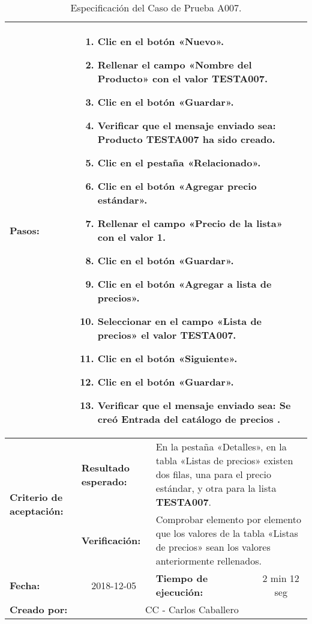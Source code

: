 \begin{table}
\begin{tabular}{|p{2.5cm}|p{2.8cm}|p{2.2cm}|p{2.8cm}|p{2.2cm}|}
\hline
\footnotesize{\textbf{Pasos:}} &
\multicolumn{4}{p{11.8cm}|}{\footnotesize{
\vspace{-3mm}
\begin{enumerate}
\item Clic en el botón «Nuevo».
\item Rellenar el campo «Nombre del Producto» con el valor \textbf{TESTA007}.
\item Clic en el botón «Guardar».
\item Verificar que el mensaje enviado sea:
    \textbf{Producto TESTA007 ha sido creado}.
\item Clic en el pestaña «Relacionado».
\item Clic en el botón «Agregar precio estándar».
\item Rellenar el campo «Precio de la lista» con el valor \textbf{1}.
\item Clic en el botón «Guardar».
\item Clic en el botón «Agregar a lista de precios».
\item Seleccionar en el campo «Lista de precios» el valor \textbf{TESTA007}.
\item Clic en el botón «Siguiente».
\item Clic en el botón «Guardar».
\item Verificar que el mensaje enviado sea:
    \textbf{Se creó Entrada del catálogo de precios .}
\end{enumerate}
\vspace{-5mm}
}} \\
\hline
\multirow{2}{2.8cm}{\footnotesize{\textbf{Criterio de aceptación:}}} &
\footnotesize{\textbf{Resultado esperado:}} &
\multicolumn{3}{p{9.1cm}|}{\footnotesize{En la pestaña «Detalles», en la tabla
«Listas de precios» existen dos filas, una para el precio estándar, y otra para
la lista \textbf{TESTA007}.}} \\
\cline{2-5}
& \footnotesize{\textbf{Verificación:}} &
\multicolumn{3}{p{9.1cm}|}{\footnotesize{Comprobar elemento por elemento que los
valores de la tabla «Listas de precios» sean los valores anteriormente
rellenados.}} \\
\hline
\footnotesize{\textbf{Fecha:}} &
\multicolumn{1}{c|}{\footnotesize{2018-12-05}} &
\multicolumn{2}{l|}{\footnotesize{\textbf{Tiempo de ejecución:}}} &
\multicolumn{1}{c|}{\footnotesize{2 min 12 seg}} \\
\hline
\footnotesize{\textbf{Creado por:}} &
\multicolumn{4}{c|}{\footnotesize{CC - Carlos Caballero}} \\
\hline
\end{tabular}
\caption{Especificación del Caso de Prueba A007.}
\label{tca007}
\end{table}


